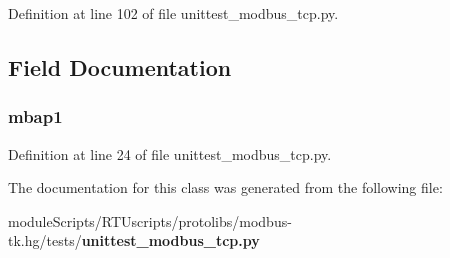 Definition at line 102 of file unittest\+\_\+modbus\+\_\+tcp.\+py.



\subsection{Field Documentation}
\subsubsection[{mbap1}]{\setlength{\rightskip}{0pt plus 5cm}mbap1}\label{classtests_1_1unittest__modbus__tcp_1_1_test_mbap_aef07e683e1055791825291d01e16ca58}


Definition at line 24 of file unittest\+\_\+modbus\+\_\+tcp.\+py.



The documentation for this class was generated from the following file\+:\begin{DoxyCompactItemize}
\item 
module\+Scripts/\+R\+T\+Uscripts/protolibs/modbus-\/tk.\+hg/tests/{\bf unittest\+\_\+modbus\+\_\+tcp.\+py}\end{DoxyCompactItemize}
